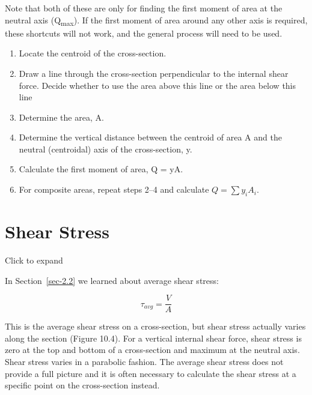 \documentclass[
  letterpaper,
  DIV=11,
  numbers=noendperiod]{scrreprt}
\providecommand{\tightlist}{%
  \setlength{\itemsep}{0pt}\setlength{\parskip}{0pt}}\usepackage{longtable,booktabs,array}
\theoremstyle{definition}
\theoremstyle{remark}
\begin{document}
Note that both of these are only for finding the first moment of area at
the neutral axis (Q\textsubscript{max}). If the first moment of area
around any other axis is required, these shortcuts will not work, and
the general process will need to be used.

\begin{tcolorbox}[enhanced jigsaw, leftrule=.75mm, colbacktitle=quarto-callout-warning-color!10!white, breakable, opacityback=0, colback=white, titlerule=0mm, toprule=.15mm, colframe=quarto-callout-warning-color-frame, coltitle=black, title={Step-by-step:}, toptitle=1mm, bottomrule=.15mm, rightrule=.15mm, left=2mm, arc=.35mm, opacitybacktitle=0.6, bottomtitle=1mm]

\begin{enumerate}
\def\labelenumi{\arabic{enumi}.}
\tightlist
\item
  Locate the centroid of the cross-section.
\item
  Draw a line through the cross-section perpendicular to the internal
  shear force. Decide whether to use the area above this line or the
  area below this line
\item
  Determine the area, A.
\item
  Determine the vertical distance between the centroid of area A and the
  neutral (centroidal) axis of the cross-section, y.
\item
  Calculate the first moment of area, Q = yA.
\item
  For composite areas, repeat steps 2--4 and calculate
  \(Q=\sum y_i A_i\).
\end{enumerate}

\end{tcolorbox}

\section{Shear Stress}\label{sec-10.2}

Click to expand

In Section~\ref{sec-2.2} we learned about average shear stress:

\[
\tau_{avg}=\frac{V}{A}
\]

This is the average shear stress on a cross-section, but shear stress
actually varies along the section (Figure 10.4). For a vertical internal
shear force, shear stress is zero at the top and bottom of a
cross-section and maximum at the neutral axis. Shear stress varies in a
parabolic fashion. The average shear stress does not provide a full
picture and it is often necessary to calculate the shear stress at a
specific point on the cross-section instead.
\end{document}
